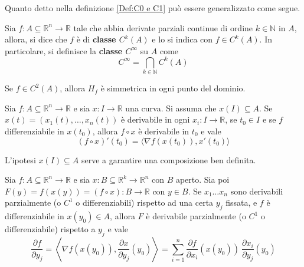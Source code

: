Quanto detto nella definizione \ref{Def:C0 e C1} può essere generalizzato come segue.
\begin{definition} \label{Def: Ck}
    Sia $f:A \subseteq \mathbb{R}^n\to \mathbb{R}$ tale che abbia derivate parziali continue di ordine $k \in \mathbb{N}$ in $A$, allora, si dice che $f$ è di \textbf{classe $C^k(A)$} e lo si indica con $f \in C^k(A)$.
    In particolare, si definisce la \textbf{classe $C^\infty$} su $A$ come
    \begin{equation}
      C^\infty= \bigcap_{k \in \mathbb{N}}{C^k(A)}
    \end{equation}
\end{definition}
\begin{corollary}
    Se $f \in C^2(A)$, allora $H_f$ è simmetrica in ogni punto del dominio.
\end{corollary}
\begin{theorem} \label{Teo: Derivata composta 1}
    Sia $f:A \subseteq \mathbb{R}^n \to \mathbb{R}$ e sia $x: I \to \mathbb{R}$ una curva. Si assuma che $x(I) \subseteq A$. Se $x(t)=(x_1(t), \dots, x_n(t))$ è derivabile in ogni $x_i:I \to \mathbb{R}$, se $t_0 \in I$ e se $f$ differenziabile in $x(t_0)$, allora
    $f \circ x$ è derivabile in $t_0$ e vale
    \begin{equation}
        (f \circ x)'(t_0)= \langle \nabla f(x(t_0)), x'(t_0) \rangle \label{Eq: Derivata composta 1}
    \end{equation}
\end{theorem}
\begin{oss}
    L'ipotesi $x(I) \subseteq A$ serve a garantire una composizione ben definita.
\end{oss}
\begin{theorem} \label{Teo: Derivata composta 2}
    Sia $f:A \subseteq \mathbb{R}^n \to \mathbb{R}$ e sia $x: B \subseteq \mathbb{R}^k \to \mathbb{R}^n$ con $B$ aperto. Sia poi $F(y)=f(x(y))=(f \circ x): B \to \mathbb{R}$ con $y \in B$. Se $x_1 \dots x_n$ sono derivabili parzialmente (o $C^1$ o differenziabili) rispetto ad una certa $y_j$ fissata, e $f$ è differenziabile in $x(y_0) \in A$, allora $F$ è derivabile parzialmente (o $C^1$ o differenziabile) rispetto a $y_j$ e vale 
    \begin{equation} \label{Eq: Derivata composta 2}
        \frac{\partial f}{\partial y_j}=\left\langle \nabla f(x(y_0)), \frac{\partial x}{\partial y_j}(y_0)\right\rangle=\sum\limits_{i=1}^{n}{\frac{\partial f}{\partial x_i}(x(y_0))\ \frac{\partial x_i}{\partial y_j}(y_0)}
    \end{equation}    
\end{theorem}
